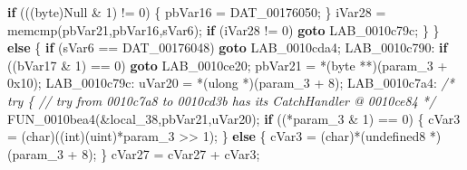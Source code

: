 \documentclass[
]{article}
\newenvironment{Shaded}{}{}
\newcommand{\BaseNTok}[1]{\textcolor[rgb]{0.25,0.63,0.44}{#1}}
\newcommand{\CommentTok}[1]{\textcolor[rgb]{0.38,0.63,0.69}{\textit{#1}}}
\newcommand{\ControlFlowTok}[1]{\textcolor[rgb]{0.00,0.44,0.13}{\textbf{#1}}}
\newcommand{\DataTypeTok}[1]{\textcolor[rgb]{0.56,0.13,0.00}{#1}}
\newcommand{\DecValTok}[1]{\textcolor[rgb]{0.25,0.63,0.44}{#1}}
\newcommand{\ExtensionTok}[1]{#1}
\newcommand{\NormalTok}[1]{#1}
\newcommand{\OperatorTok}[1]{\textcolor[rgb]{0.40,0.40,0.40}{#1}}
\begin{document}
\begin{Shaded}
\begin{Highlighting}[]
      \ControlFlowTok{if} \OperatorTok{(((}\NormalTok{byte}\OperatorTok{)}\NormalTok{Null }\OperatorTok{\&} \DecValTok{1}\OperatorTok{)} \OperatorTok{!=} \DecValTok{0}\OperatorTok{)} \OperatorTok{\{}
\NormalTok{        pbVar16 }\OperatorTok{=}\NormalTok{ DAT\_00176050}\OperatorTok{;}
      \OperatorTok{\}}
\NormalTok{      iVar28 }\OperatorTok{=}\NormalTok{ memcmp}\OperatorTok{(}\NormalTok{pbVar21}\OperatorTok{,}\NormalTok{pbVar16}\OperatorTok{,}\NormalTok{sVar6}\OperatorTok{);}
      \ControlFlowTok{if} \OperatorTok{(}\NormalTok{iVar28 }\OperatorTok{!=} \DecValTok{0}\OperatorTok{)} \ControlFlowTok{goto}\NormalTok{ LAB\_0010c79c}\OperatorTok{;}
    \OperatorTok{\}}
  \OperatorTok{\}}
  \ControlFlowTok{else} \OperatorTok{\{}
    \ControlFlowTok{if} \OperatorTok{(}\NormalTok{sVar6 }\OperatorTok{==}\NormalTok{ DAT\_00176048}\OperatorTok{)} \ControlFlowTok{goto}\NormalTok{ LAB\_0010cda4}\OperatorTok{;}
\NormalTok{LAB\_0010c790}\OperatorTok{:}
    \ControlFlowTok{if} \OperatorTok{((}\NormalTok{bVar17 }\OperatorTok{\&} \DecValTok{1}\OperatorTok{)} \OperatorTok{==} \DecValTok{0}\OperatorTok{)} \ControlFlowTok{goto}\NormalTok{ LAB\_0010ce20}\OperatorTok{;}
\NormalTok{    pbVar21 }\OperatorTok{=} \OperatorTok{*(}\NormalTok{byte }\OperatorTok{**)(}\NormalTok{param\_3 }\OperatorTok{+} \BaseNTok{0x10}\OperatorTok{);}
\NormalTok{LAB\_0010c79c}\OperatorTok{:}
\NormalTok{    uVar20 }\OperatorTok{=} \OperatorTok{*(}\ExtensionTok{ulong} \OperatorTok{*)(}\NormalTok{param\_3 }\OperatorTok{+} \DecValTok{8}\OperatorTok{);}
\NormalTok{LAB\_0010c7a4}\OperatorTok{:}
                    \CommentTok{/* try \{ // try from 0010c7a8 to 0010cd3b has its CatchHandler @ 0010ce84 */}
\NormalTok{    FUN\_0010bea4}\OperatorTok{(\&}\NormalTok{local\_38}\OperatorTok{,}\NormalTok{pbVar21}\OperatorTok{,}\NormalTok{uVar20}\OperatorTok{);}
    \ControlFlowTok{if} \OperatorTok{((*}\NormalTok{param\_3 }\OperatorTok{\&} \DecValTok{1}\OperatorTok{)} \OperatorTok{==} \DecValTok{0}\OperatorTok{)} \OperatorTok{\{}
\NormalTok{      cVar3 }\OperatorTok{=} \OperatorTok{(}\DataTypeTok{char}\OperatorTok{)((}\DataTypeTok{int}\OperatorTok{)(}\ExtensionTok{uint}\OperatorTok{)*}\NormalTok{param\_3 }\OperatorTok{\textgreater{}\textgreater{}} \DecValTok{1}\OperatorTok{);}
    \OperatorTok{\}}
    \ControlFlowTok{else} \OperatorTok{\{}
\NormalTok{      cVar3 }\OperatorTok{=} \OperatorTok{(}\DataTypeTok{char}\OperatorTok{)*(}\NormalTok{undefined8 }\OperatorTok{*)(}\NormalTok{param\_3 }\OperatorTok{+} \DecValTok{8}\OperatorTok{);}
    \OperatorTok{\}}
\NormalTok{    cVar27 }\OperatorTok{=}\NormalTok{ cVar27 }\OperatorTok{+}\NormalTok{ cVar3}\OperatorTok{;}

\end{Highlighting}
\end{Shaded}
\end{document}
